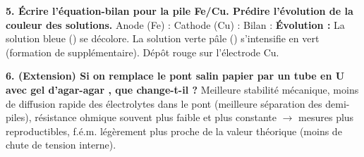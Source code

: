 \documentclass[11pt]{article}
\begin{document}
\begin{exoresolu}
\textbf{5. Écrire l'équation-bilan pour la pile Fe/Cu. Prédire l'évolution de la couleur des solutions.}
\tcblower
Anode (Fe) : 
Cathode (Cu) : 
Bilan : 
\textbf{Évolution :} La solution bleue () se décolore. La solution verte pâle () s'intensifie en vert (formation de  supplémentaire). Dépôt rouge sur l'électrode Cu.

\textbf{6. (Extension) Si on remplace le pont salin papier par un tube en U avec gel d'agar-agar , que change-t-il ?}
\tcblower
Meilleure stabilité mécanique, moins de diffusion rapide des électrolytes dans le pont (meilleure séparation des demi-piles), résistance ohmique souvent plus faible et plus constante $\to$ mesures plus reproductibles, f.é.m. légèrement plus proche de la valeur théorique (moins de chute de tension interne).
\end{exoresolu}
\end{document}
